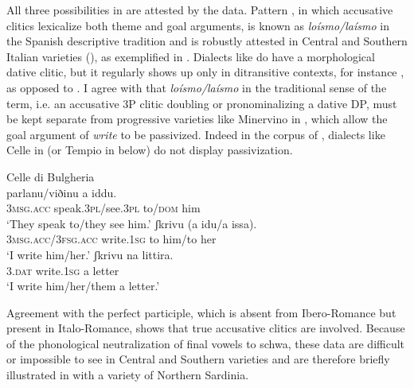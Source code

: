 \documentclass[output=paper,colorlinks,citecolor=brown,nonflat]{./langscibook}
\begin{document}
All three possibilities in  are attested by the data. Pattern , in which accusative clitics lexicalize both theme and goal arguments, is known as \textit{loísmo/laísmo} in the Spanish descriptive tradition and is robustly attested in Central and Southern Italian varieties (\citealt[§633]{Rohlfs1969}), as exemplified in . Dialects like  do have a morphological dative clitic, but it regularly shows up only in ditransitive contexts, for instance , as opposed to . I agree with \citet{Pineda2016} that \textit{loísmo/laísmo} in the traditional sense of the term, i.e. an accusative 3P clitic doubling or pronominalizing a dative DP, must be kept separate from progressive varieties like Minervino in , which allow the goal argument of \textit{write} to be passivized. Indeed in the corpus of \citet{ManziniSavoia2005}, dialects like Celle in  (or Tempio in  below) do not display passivization.

\ea%
    \label{ex:manzini:21}
    Celle di Bulgheria \citep{ManziniSavoia2005}\\
    \ea\label{ex:manzini:21a}
        {parlanu/viðinu}   {a}   {iddu}.\\
        \textsc{3msg.acc}  speak.\textsc{3pl}/see.\textsc{3pl} to/\textsc{dom} him\\
    \glt ‘They speak to/they see him.’
    \ex\label{ex:manzini:21b}
           {ʃkrivu}     (a {idu/a} issa).\\
        \textsc{3msg.acc/3fsg.acc} write.\textsc{1sg}   to him/to her\\
    \glt ‘I write him/her.’
    \ex\label{ex:manzini:21c}
       {ʃkrivu}     {na} {littira}.\\
        \textsc{3.dat}   write.\textsc{1sg}   a letter\\
    \glt ‘I write him/her/them a letter.’
    \z
\z


Agreement with the perfect participle, which is absent from Ibero-Romance but present in Italo-Romance, shows that true accusative clitics are involved. Because of the phonological neutralization of final vowels to schwa, these data are difficult or impossible to see in Central and Southern varieties and are therefore briefly illustrated in  with a variety of Northern Sardinia.%
\end{document}
